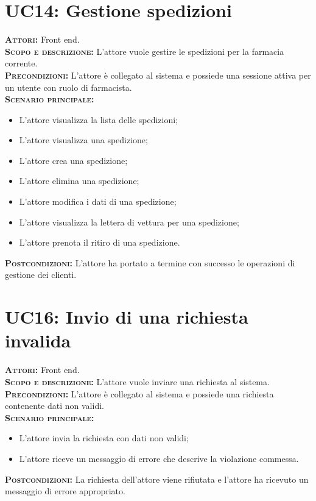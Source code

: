 \section{UC14: Gestione spedizioni}
\label{sec:UC13}
\textsc{\textbf{Attori:}} Front end.\\
\textsc{\textbf{Scopo e descrizione:}} L'attore vuole gestire le spedizioni per la farmacia corrente.\\
\textsc{\textsc{\textbf{Precondizioni:}}} L'attore è collegato al sistema e possiede una sessione attiva per un utente con ruolo di farmacista.\\
\textsc{\textbf{Scenario principale:}}
\begin{itemize}
    \item L'attore visualizza la lista delle spedizioni;
    \item L'attore visualizza una spedizione;
    \item L'attore crea una spedizione;
    \item L'attore elimina una spedizione;
    \item L'attore modifica i dati di una spedizione;
    \item L'attore visualizza la lettera di vettura per una spedizione;
    \item L'attore prenota il ritiro di una spedizione.
\end{itemize}
\textsc{\textbf{Postcondizioni:}} L'attore ha portato a termine con successo le operazioni di gestione dei clienti.

\section{UC16: Invio di una richiesta invalida}
\label{sec:UC16}
\textsc{\textbf{Attori:}} Front end.\\
\textsc{\textbf{Scopo e descrizione:}} L'attore vuole inviare una richiesta al sistema.\\
\textsc{\textsc{\textbf{Precondizioni:}}} L'attore è collegato al sistema e possiede una richiesta contenente dati non validi.\\
\textsc{\textbf{Scenario principale:}}
\begin{itemize}
    \item L'attore invia la richiesta con dati non validi;
    \item L'attore riceve un messaggio di errore che descrive la violazione commessa.
\end{itemize}
\textsc{\textbf{Postcondizioni:}} La richiesta dell'attore viene rifiutata e l'attore ha ricevuto un messaggio di errore appropriato.